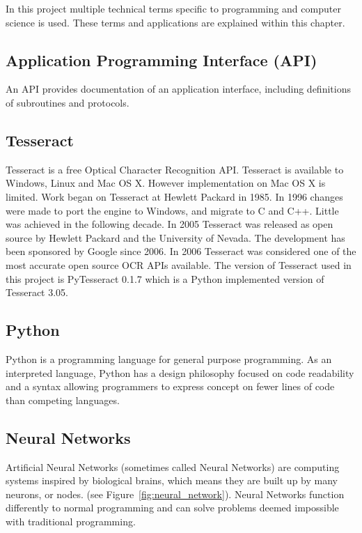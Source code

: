 \documentclass[../main.tex]{subfiles}
\begin{document}
In this project multiple technical terms specific to programming and computer
science is used. These terms and applications are explained within this
chapter.  

\subsection{Application Programming Interface (API)}

An API provides documentation of an application interface, including
definitions of subroutines and protocols. 

\subsection{Tesseract}

Tesseract is a free Optical Character Recognition API\@. Tesseract is available
to Windows, Linux and Mac OS X. However implementation on Mac OS X is limited.
Work began on Tesseract at Hewlett Packard in 1985. In 1996 changes were made
to port the engine to Windows, and migrate to C and C++. Little was achieved
in the following decade. In 2005 Tesseract was released as open source by
Hewlett Packard and the University of Nevada. The development has been
sponsored by Google since 2006. In 2006 Tesseract was considered one of the
most accurate open source OCR APIs available. The version of Tesseract used in
this project is PyTesseract 0.1.7 which is a Python implemented version of
Tesseract 3.05.

\subsection{Python}

Python is a programming language for general purpose programming. As an
interpreted language, Python has a design philosophy focused on code
readability and a syntax allowing programmers to express concept on fewer
lines of code than competing languages. 

\subsection{Neural Networks}

Artificial Neural Networks (sometimes called Neural Networks) are computing
systems inspired by biological brains, which means they are built up by many
neurons, or nodes. (see Figure~\ref{fig:neural_network}). Neural Networks
function differently to normal programming and can solve problems deemed 
impossible with traditional programming. 
\end{document}
